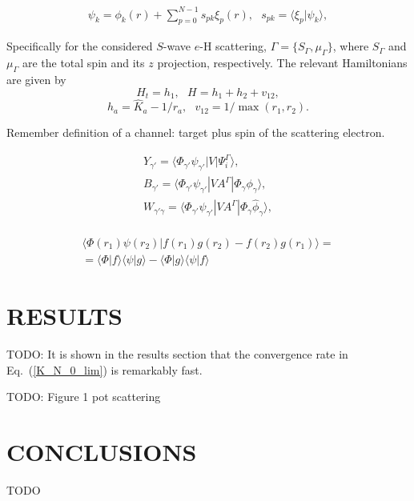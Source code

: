 \documentclass[aip
, pra
, showpacs
, aps
, twocolumn
, groupedaddress
, floatfix
]{revtex4}
\newcommand{\beq}{\begin{equation}}
\newcommand{\eeq}{\end{equation}}
\newcommand{\barr}{\begin{array}}
\newcommand{\earr}{\end{array}}
\begin{document}
\beq \barr{l}
\psi_k = \phi_k(r) +  \sum_{p=0}^{N-1} s_{pk} \xi_p(r), \ \ \ s_{pk} = \langle \xi_p | \psi_k \rangle,
\earr \label{Psi_} \eeq


Specifically for the considered $S$-wave $e$-H scattering,
$\Gamma=\{S_\Gamma,\mu_\Gamma\}$, where $S_\Gamma$ and $\mu_\Gamma$ are the total spin and its $z$ projection, respectively.
The relevant Hamiltonians are given by
\beq
H_t = h_1, \ \ \ H = h_1 + h_2 + v_{12},
\label{H_t} \eeq
\beq
h_a = \hat{K}_a  - 1/r_a,\ \ \ v_{12} = 1/\max{(r_{1}, r_{2})}.
\label{h_b} \eeq


Remember definition of a channel: target plus spin of the scattering electron.


\beq \barr{l}
Y_{\gamma'} = \langle \Phi_{\gamma'}  \psi_{\gamma'} |V|\Psi_i^{\Gamma} \rangle,\\
B_{\gamma'} = \langle  \Phi_{\gamma'}  \psi_{\gamma'} |VA^{\Gamma} |\Phi_{\gamma} \phi_{\gamma} \rangle,\\
W_{\gamma' \gamma} = \langle \Phi_{\gamma'}  \psi_{\gamma'} |V A^{\Gamma} |\Phi_{\gamma} \widehat{\phi}_{\gamma} \rangle,\\
\earr \label{Psi_} \eeq

\beq \barr{l}
\langle  \Phi(r_1) \psi(r_2) |f(r_1) g(r_2) - f(r_2) g(r_1) \rangle = \\
=\langle  \Phi |f \rangle  \langle  \psi |g \rangle -
\langle  \Phi |g \rangle  \langle  \psi |f \rangle
\earr \eeq


\section{RESULTS}
TODO: It is shown in the results section that the convergence rate in Eq.~(\ref{K_N_0_lim}) is remarkably fast.

TODO: Figure 1 pot scattering

\section{CONCLUSIONS}
TODO


\begin{acknowledgments}
\end{acknowledgments}





%
\end{document}
